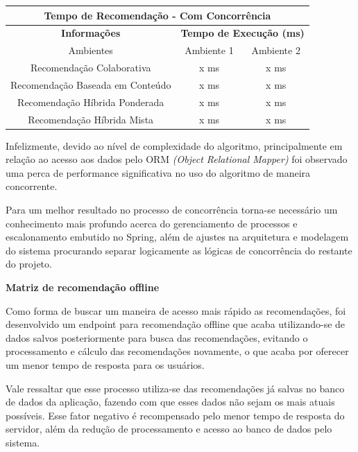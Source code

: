 \begin{table}[H]
\centering
\begin{tabular}{|c|c|c|}
\hline
\multicolumn{3}{|c|}{\textbf{Tempo de Recomendação - Com Concorrência}}                      \\ \hline
\textbf{Informações}                  & \multicolumn{2}{c|}{\textbf{Tempo de Execução (ms)}} \\ \hline
Ambientes                             & Ambiente 1                & Ambiente 2               \\ \hline
Recomendação Colaborativa             & x ms                      & x ms                     \\ \hline
Recomendação Baseada em Conteúdo      & x ms                      & x ms                     \\ \hline
Recomendação Híbrida Ponderada        & x ms                      & x ms                     \\ \hline
Recomendação Híbrida Mista            & x ms                      & x ms                     \\ \hline
\end{tabular}
\end{table}

Infelizmente, devido ao nível de complexidade do algoritmo, principalmente em relação ao acesso aos dados pelo ORM \textit{(Object Relational Mapper)} foi observado uma perca de performance significativa no uso do algoritmo de maneira concorrente.

Para um melhor resultado no processo de concorrência torna-se necessário um conhecimento mais profundo acerca do gerenciamento de processos e escalonamento embutido no Spring, além de ajustes na arquitetura e modelagem do sistema procurando separar logicamente as lógicas de concorrência do restante do projeto.


\textbf{Matriz de recomendação offline}

Como forma de buscar um maneira de acesso mais rápido as recomendações, foi desenvolvido um endpoint para recomendação offline que acaba utilizando-se de dados salvos posteriormente para busca das recomendações, evitando o processamento e cálculo das recomendações novamente, o que acaba por oferecer um menor tempo de resposta para os usuários.

Vale ressaltar que esse processo utiliza-se das recomendações já salvas no banco de dados da aplicação, fazendo com que esses dados não sejam os mais atuais possíveis. Esse fator negativo é recompensado pelo menor tempo de resposta do servidor, além da redução de processamento e acesso ao banco de dados pelo sistema.

